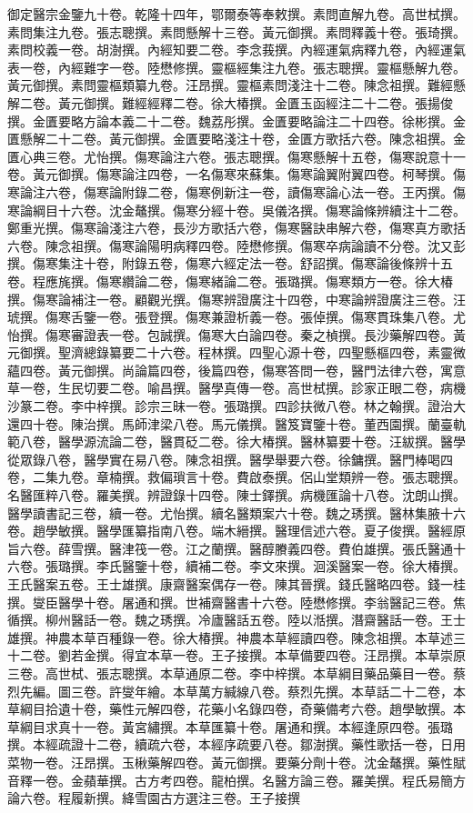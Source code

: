 \begin{pinyinscope}
御定醫宗金鑒九十卷。乾隆十四年，鄂爾泰等奉敕撰。素問直解九卷。高世栻撰。素問集注九卷。張志聰撰。素問懸解十三卷。黃元御撰。素問釋義十卷。張琦撰。素問校義一卷。胡澍撰。內經知要二卷。李念莪撰。內經運氣病釋九卷，內經運氣表一卷，內經難字一卷。陸懋修撰。靈樞經集注九卷。張志聰撰。靈樞懸解九卷。黃元御撰。素問靈樞類纂九卷。汪昂撰。靈樞素問淺注十二卷。陳念祖撰。難經懸解二卷。黃元御撰。難經經釋二卷。徐大椿撰。金匱玉函經注二十二卷。張揚俊撰。金匱要略方論本義二十二卷。魏荔彤撰。金匱要略論注二十四卷。徐彬撰。金匱懸解二十二卷。黃元御撰。金匱要略淺注十卷，金匱方歌括六卷。陳念祖撰。金匱心典三卷。尤怡撰。傷寒論注六卷。張志聰撰。傷寒懸解十五卷，傷寒說意十一卷。黃元御撰。傷寒論注四卷，一名傷寒來蘇集。傷寒論翼附翼四卷。柯琴撰。傷寒論注六卷，傷寒論附錄二卷，傷寒例新注一卷，讀傷寒論心法一卷。王丙撰。傷寒論綱目十六卷。沈金鼇撰。傷寒分經十卷。吳儀洛撰。傷寒論條辨續注十二卷。鄭重光撰。傷寒論淺注六卷，長沙方歌括六卷，傷寒醫訣串解六卷，傷寒真方歌括六卷。陳念祖撰。傷寒論陽明病釋四卷。陸懋修撰。傷寒卒病論讀不分卷。沈又彭撰。傷寒集注十卷，附錄五卷，傷寒六經定法一卷。舒詔撰。傷寒論後條辨十五卷。程應旄撰。傷寒纘論二卷，傷寒緒論二卷。張璐撰。傷寒類方一卷。徐大椿撰。傷寒論補注一卷。顧觀光撰。傷寒辨證廣注十四卷，中寒論辨證廣注三卷。汪琥撰。傷寒舌鑒一卷。張登撰。傷寒兼證析義一卷。張倬撰。傷寒貫珠集八卷。尤怡撰。傷寒審證表一卷。包誠撰。傷寒大白論四卷。秦之楨撰。長沙藥解四卷。黃元御撰。聖濟總錄纂要二十六卷。程林撰。四聖心源十卷，四聖懸樞四卷，素靈微蘊四卷。黃元御撰。尚論篇四卷，後篇四卷，傷寒答問一卷，醫門法律六卷，寓意草一卷，生民切要二卷。喻昌撰。醫學真傳一卷。高世栻撰。診家正眼二卷，病機沙篆二卷。李中梓撰。診宗三昧一卷。張璐撰。四診扶微八卷。林之翰撰。證治大還四十卷。陳治撰。馬師津梁八卷。馬元儀撰。醫笈寶鑒十卷。董西園撰。蘭臺軌範八卷，醫學源流論二卷，醫貫砭二卷。徐大椿撰。醫林纂要十卷。汪紱撰。醫學從眾錄八卷，醫學實在易八卷。陳念祖撰。醫學舉要六卷。徐鏞撰。醫門棒喝四卷，二集九卷。章楠撰。救偏瑣言十卷。費啟泰撰。侶山堂類辨一卷。張志聰撰。名醫匯粹八卷。羅美撰。辨證錄十四卷。陳士鐸撰。病機匯論十八卷。沈朗山撰。醫學讀書記三卷，續一卷。尤怡撰。續名醫類案六十卷。魏之琇撰。醫林集腋十六卷。趙學敏撰。醫學匯纂指南八卷。端木縉撰。醫理信述六卷。夏子俊撰。醫經原旨六卷。薛雪撰。醫津筏一卷。江之蘭撰。醫醇賸義四卷。費伯雄撰。張氏醫通十六卷。張璐撰。李氏醫鑒十卷，續補二卷。李文來撰。洄溪醫案一卷。徐大椿撰。王氏醫案五卷。王士雄撰。康齋醫案偶存一卷。陳其晉撰。錢氏醫略四卷。錢一桂撰。燮臣醫學十卷。屠通和撰。世補齋醫書十六卷。陸懋修撰。李翁醫記三卷。焦循撰。柳州醫話一卷。魏之琇撰。冷廬醫話五卷。陸以湉撰。潛齋醫話一卷。王士雄撰。神農本草百種錄一卷。徐大椿撰。神農本草經讀四卷。陳念祖撰。本草述三十二卷。劉若金撰。得宜本草一卷。王子接撰。本草備要四卷。汪昂撰。本草崇原三卷。高世栻、張志聰撰。本草通原二卷。李中梓撰。本草綱目藥品藥目一卷。蔡烈先編。圖三卷。許燮年繪。本草萬方緘線八卷。蔡烈先撰。本草話二十二卷，本草綱目拾遺十卷，藥性元解四卷，花藥小名錄四卷，奇藥備考六卷。趙學敏撰。本草綱目求真十一卷。黃宮繡撰。本草匯纂十卷。屠通和撰。本經逢原四卷。張璐撰。本經疏證十二卷，續疏六卷，本經序疏要八卷。鄒澍撰。藥性歌括一卷，日用菜物一卷。汪昂撰。玉楸藥解四卷。黃元御撰。要藥分劑十卷。沈金鼇撰。藥性賦音釋一卷。金蘋華撰。古方考四卷。龍柏撰。名醫方論三卷。羅美撰。程氏易簡方論六卷。程履新撰。絳雪園古方選注三卷。王子接撰
\end{pinyinscope}
